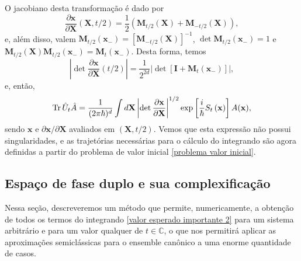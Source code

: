 \documentclass[
	12pt,
	oneside,			%
	a4paper,			%
	english,			%
	brazil				%
	]{abntex2}
\theoremstyle{definition}
\begin{document}
O jacobiano desta transformação é dado por
\begin{equation}
    \frac{\partial \mathbf{x}}{\partial \mathbf{X}}(\mathbf{X},t/2) = \frac{1}{2}\left(\mathbf{M}_{t/2}\left( \mathbf{X} \right) + \mathbf{M}_{-t/2}\left( \mathbf{X} \right) \right),
\end{equation}
e, além disso, valem $\mathbf{M}_{t/2}(\mathbf{x}_-) =  \left[ \mathbf{M}_{-t/2}\left( \mathbf{X}     \right) \right]^{-1}$, $\det \mathbf{M}_{t/2}(\mathbf{x}_-) = 1$ e $\mathbf{M}_{t/2}\left(\mathbf{X}     \right)\mathbf{M}_{t/2}\left(\mathbf{x}_- \right) = \mathbf{M}_{t}\left(\mathbf{x}_- \right)$. Desta forma, temos
\begin{equation}
    \left| \det\frac{ \partial \mathbf{x}}{\partial \mathbf{X}}(t/2) \right| = \frac{1}{2^{2d}} \left|\det \left[ \mathbf{I} + \mathbf{M}_{t}\left(\mathbf{x}_- \right)\right] \right|,
\end{equation}
e, então,
\begin{equation}
\label{valor esperado importante 2}
    \Tr \hat{U}_t \hat{A} = \frac{1}{(2\pi \hbar)^d}\int d \mathbf{X}  \left|\det \frac{\partial \mathbf{x}}{\partial \mathbf{X}} \right|^{1/2} \exp \left[ \frac{i}{\hbar} S_t \left(\mathbf{x} \right) \right] A(\mathbf{x} ),
\end{equation}
sendo $\mathbf{x}$ e $\partial \mathbf{x}/\partial \mathbf{X}$ avaliados em $\left(\mathbf{X},t/2 \right)$. Vemos que esta expressão não possui singularidades, e as trajetórias necessárias para o cálculo do integrando são agora definidas a partir do problema de valor inicial \eqref{problema valor inicial}.

\subsection{Espaço de fase duplo e sua complexificação}

Nessa seção, descreveremos um método que permite, numericamente, a obtenção de todos os termos do integrando \eqref{valor esperado importante 2} para um sistema arbitrário e para um valor qualquer de $t \in \mathbb{C}$, o que nos permitirá aplicar as aproximações semiclássicas para o ensemble canônico a uma enorme quantidade de casos.
\end{document}
